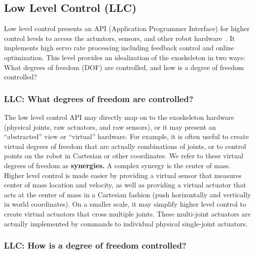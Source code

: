 \documentclass[letterpaper,12pt,fullpage]{article}
\begin{document}
\subsection{Low Level Control (LLC)}

Low level control presents an API (Application Programmer Interface)
for higher control levels
to access the actuators, sensors, and other robot hardware~\cite{IEEE07271219}.
It implements high servo rate processing including feedback control and online
optimization.
This level provides an idealization of the exoskeleton in two ways: 
What degrees of freedom (DOF) are controlled, and how is a degree of
freedom controlled?

\subsubsection{LLC: What degrees of freedom are controlled?}

The low level control API may directly map on to the exoskeleton hardware
(physical joints,
raw actuators, and raw sensors), or
it may present an ``abstracted'' view or ``virtual'' hardware.
For example, it is often useful to create virtual degrees of freedom that are
actually combinations of joints, or to control points on the robot in Cartesian
or other coordinates. We refer to these virtual degrees of freedom as {\bf synergies.}
A complex synergy is the center of mass. Higher level control is made easier by
providing a virtual sensor that measures center of mass location and velocity,
as well as providing a virtual actuator that acts at the center of mass in
a Cartesian fashion (push horizontally and vertically in world coordinates).
On a smaller scale, it may simplify higher level control 
to create virtual actuators that cross
multiple joints. These multi-joint actuators are actually implemented by commands
to individual physical single-joint actuators.

\subsubsection{LLC: How is a degree of freedom controlled?}
\end{document}
